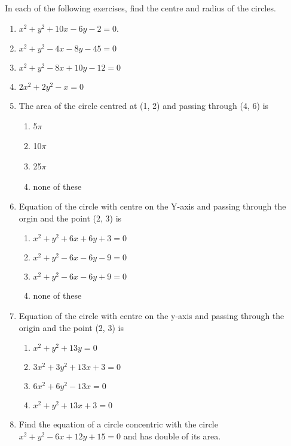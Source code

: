 In each of the following exercises,   find the centre and radius of the circles.
\begin{enumerate}[label=\thesubsection.\arabic*, ref=\thesubsection.\theenumi, resume*]
\item  $x^2+y^2 +10x -6y -2=0$. 
	 \\
		\solution
\label{chapters/11/11/1/6}

\item  $x^{2}+y^{2}-4 x-8 y-45=0$
	 \\
		\solution
\label{chapters/11/11/1/7}

\item  $x^{2}+y^{2}-8 x+10 y-12=0$ 
	 \\
		\solution
\label{chapters/11/11/1/8}

\item  $2 x^{2}+2 y^{2}-x=0$
	 \\
		\solution
\label{chapters/11/11/1/9}

\item The area of the circle centred at (1, 2) and passing through (4, 6) is
\begin{enumerate}
\item 5$\pi$ 
\item 10$\pi$
 \item 25$\pi$ 
\item none of these
\end{enumerate}
\item Equation of the circle with centre on the Y-axis and passing through the orgin and the point (2, 3) is
\begin{enumerate}
\item $x^2+y^2+6x+6y+3=0$ 
\item $x^2+y^2-6x-6y-9=0$
\item $x^2+y^2-6x-6y+9=0$
\item none of these
\end{enumerate}
\item Equation of the circle with centre on the  y-axis and passing through the origin and the point (2, 3) is  
\begin{enumerate}
\item $x^2+y^2+13y=0$
\item $3x^2+3y^2+13x+3=0$
\item $6x^2+6y^2-13x=0$
\item $x^2+y^2+13x+3=0$
\end{enumerate}
 \item Find the equation of a circle concentric with the circle $x^2+y^2-6x+12y+15=0$ and has double of its area.

\end{enumerate}
